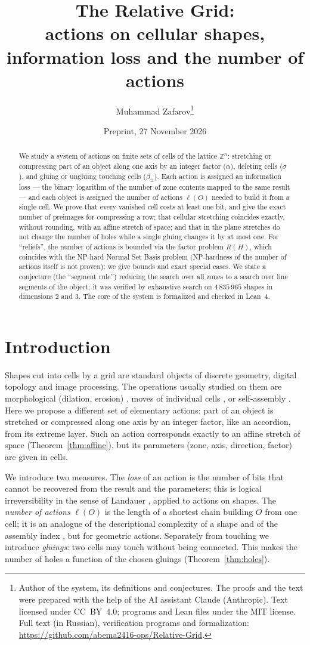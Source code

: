 \documentclass[11pt,a4paper]{article}
\title{\textbf{The Relative Grid:\\ actions on cellular shapes,\\ information loss and the number of actions}}
\author{Muhammad Zafarov\thanks{Author of the system, its definitions and conjectures. The proofs and the text were prepared with the help of the AI assistant Claude (Anthropic). Text licensed under CC~BY~4.0; programs and Lean files under the MIT license. Full text (in Russian), verification programs and formalization: \url{https://github.com/abema2416-ops/Relative-Grid}.}}
\date{Preprint, 27 November 2026}
\theoremstyle{plain}
\theoremstyle{definition}
\theoremstyle{remark}
\newcommand{\Z}{\mathbb{Z}}
\begin{document}
\maketitle

\begin{abstract}
We study a system of actions on finite sets of cells of the lattice $\Z^n$: stretching or compressing part of an object along one axis by an integer factor ($\alpha$), deleting cells ($\sigma$), and gluing or ungluing touching cells ($\beta_\pm$). Each action is assigned an information loss — the binary logarithm of the number of zone contents mapped to the same result — and each object is assigned the number of actions $\ell(O)$ needed to build it from a single cell. We prove that every vanished cell costs at least one bit, and give the exact number of preimages for compressing a row; that cellular stretching coincides exactly, without rounding, with an affine stretch of space; and that in the plane stretches do not change the number of holes while a single gluing changes it by at most one. For ``reliefs'', the number of actions is bounded via the factor problem $R(H)$, which coincides with the NP-hard Normal Set Basis problem (NP-hardness of the number of actions itself is not proven); we give bounds and exact special cases. We state a conjecture (the ``segment rule'') reducing the search over all zones to a search over line segments of the object; it was verified by exhaustive search on $4\,835\,965$ shapes in dimensions 2 and 3. The core of the system is formalized and checked in Lean~4.
\end{abstract}

\section{Introduction}

Shapes cut into cells by a grid are standard objects of discrete geometry, digital topology and image processing. The operations usually studied on them are morphological (dilation, erosion) \cite{serra}, moves of individual cells \cite{akitaya}, or self-assembly \cite{soloveichik}. Here we propose a different set of elementary actions: part of an object is stretched or compressed along one axis by an integer factor, like an accordion, from its extreme layer. Such an action corresponds exactly to an affine stretch of space (Theorem~\ref{thm:affine}), but its parameters (zone, axis, direction, factor) are given in cells.

We introduce two measures. The \emph{loss} of an action is the number of bits that cannot be recovered from the result and the parameters; this is logical irreversibility in the sense of Landauer \cite{landauer}, applied to actions on shapes. The \emph{number of actions} $\ell(O)$ is the length of a shortest chain building $O$ from one cell; it is an analogue of the descriptional complexity of a shape \cite{soloveichik} and of the assembly index \cite{assembly}, but for geometric actions. Separately from touching we introduce \emph{gluings}: two cells may touch without being connected. This makes the number of holes a function of the chosen gluings (Theorem~\ref{thm:holes}).
\end{document}

